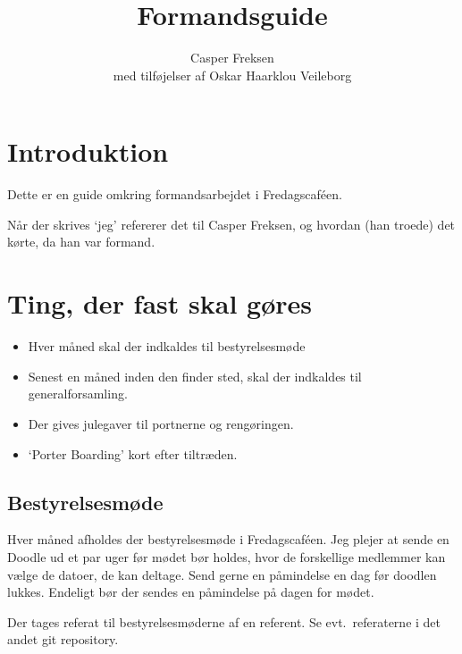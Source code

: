 

\title{Formandsguide}
\date{}
\author{Casper Freksen\\
\small med tilføjelser af Oskar Haarklou Veileborg}



\maketitle

\section{Introduktion}
\label{sec:introduktion}

Dette er en guide omkring formandsarbejdet i Fredagscaféen.

Når der skrives `jeg' refererer det til Casper Freksen, og hvordan
(han troede) det kørte, da han var formand.

\section{Ting, der fast skal gøres}
\label{sec:ting-der-skal}

\begin{itemize}
\item Hver måned skal der indkaldes til bestyrelsesmøde
\item Senest en måned inden den finder sted, skal der indkaldes til
  generalforsamling.
\item Der gives julegaver til portnerne og rengøringen.
\item `Porter Boarding' kort efter tiltræden.
\end{itemize}

\subsection{Bestyrelsesmøde}
\label{sec:bestyrelsesmode}

Hver måned afholdes der bestyrelsesmøde i Fredagscaféen. Jeg plejer at
sende en Doodle ud et par uger før mødet bør holdes, hvor de forskellige medlemmer kan
vælge de datoer, de kan deltage. Send gerne en påmindelse en dag før doodlen
lukkes. Endeligt bør der sendes en påmindelse på dagen for mødet.

Der tages referat til bestyrelsesmøderne af en referent. Se
evt.~referaterne i det andet git repository.

